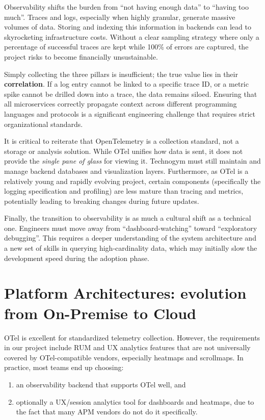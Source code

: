 \documentclass[12pt,a4paper,openright,twoside]{book}
\begin{document}
Observability shifts the burden from ``not having enough data'' to ``having too much''. Traces and logs, especially when highly granular, generate massive volumes of data. Storing and indexing this information in backends can lead to skyrocketing infrastructure costs. Without a clear sampling strategy where only a percentage of successful traces are kept while 100\% of errors are captured, the project risks to become financially unsustainable.

Simply collecting the three pillars is insufficient; the true value lies in their \textbf{correlation}. If a log entry cannot be linked to a specific trace ID, or a metric spike cannot be drilled down into a trace, the data remains siloed. Ensuring that all microservices correctly propagate context across different programming languages and protocols is a significant engineering challenge that requires strict organizational standards.

It is critical to reiterate that OpenTelemetry is a collection standard, not a storage or analysis solution. While OTel unifies how data is sent, it does not provide the \textit{single pane of glass} for viewing it. Technogym must still maintain and manage backend databases and visualization layers. Furthermore, as \ac{OTel} is a relatively young and rapidly evolving project, certain components (specifically the logging specification and profiling) are less mature than tracing and metrics, potentially leading to breaking changes during future updates.

Finally, the transition to observability is as much a cultural shift as a technical one. Engineers must move away from ``dashboard-watching'' toward ``exploratory debugging''. This requires a deeper understanding of the system architecture and a new set of skills in querying high-cardinality data, which may initially slow the development speed during the adoption phase. 

\section{Platform Architectures: evolution from On-Premise to Cloud}

\ac{OTel} is excellent for standardized telemetry collection. However, the requirements in our project include \ac{RUM} and \ac{UX} analytics features that are not universally covered by OTel-compatible vendors, especially heatmaps and scrollmaps. In practice, most teams end up choosing:
\begin{enumerate}
    \item an observability backend that supports \ac{OTel} well, and
    \item optionally a UX/session analytics tool for dashboards and heatmaps, due to the fact that many \ac{APM} vendors do not do it specifically. 
\end{enumerate}
\end{document}
